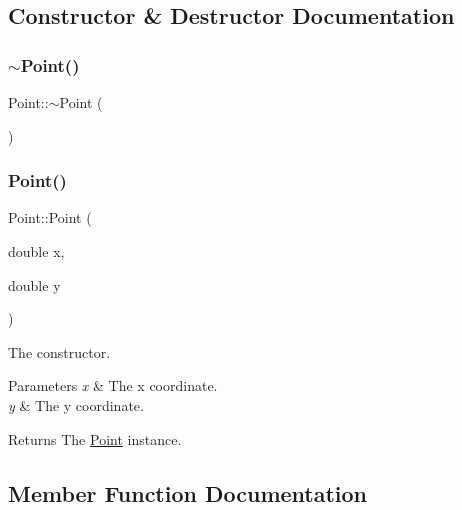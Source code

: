\subsection{Constructor \& Destructor Documentation}
\mbox{\label{class_point_a395fa04b4ec126b66fc053f829a30cc1}} 
\subsubsection{\texorpdfstring{$\sim$Point()}{~Point()}}
{\footnotesize\ttfamily Point\+::$\sim$\+Point (\begin{DoxyParamCaption}{ }\end{DoxyParamCaption})\hspace{0.3cm}{\ttfamily [inline]}}

\mbox{\label{class_point_a78b55e8d5466bb8c2cf60fa55f2562ff}} 
\subsubsection{\texorpdfstring{Point()}{Point()}}
{\footnotesize\ttfamily Point\+::\+Point (\begin{DoxyParamCaption}\item[{double}]{x,  }\item[{double}]{y }\end{DoxyParamCaption})}



The constructor. 


\begin{DoxyParams}{Parameters}
{\em x} & The x coordinate. \\
\hline
{\em y} & The y coordinate. \\
\hline
\end{DoxyParams}
\begin{DoxyReturn}{Returns}
The \mbox{\hyperlink{class_point}{Point}} instance. 
\end{DoxyReturn}


\subsection{Member Function Documentation}
\mbox{\label{class_point_acdc86ab607b2ae8415152883e2629015}} 
